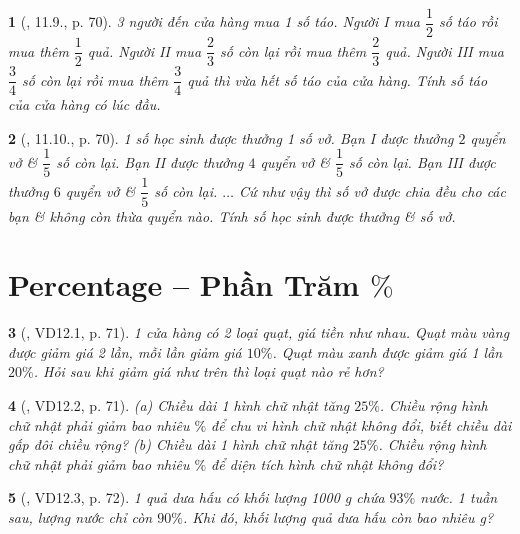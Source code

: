 \documentclass{article}
\newtheorem{baitoan}{}
\begin{document}
\begin{baitoan}[\cite{TLCT_THCS_Toan_6_so_hoc}, 11.9., p. 70]
	3 người đến cửa hàng mua 1 số táo. Người I mua $\dfrac{1}{2}$ số táo rồi mua thêm $\dfrac{1}{2}$ quả. Người II mua $\dfrac{2}{3}$ số còn lại rồi mua thêm $\dfrac{2}{3}$ quả. Người III mua $\dfrac{3}{4}$ số còn lại rồi mua thêm $\dfrac{3}{4}$ quả thì vừa hết số táo của cửa hàng. Tính số táo của cửa hàng có lúc đầu.
\end{baitoan}

\begin{baitoan}[\cite{TLCT_THCS_Toan_6_so_hoc}, 11.10., p. 70]
	1 số học sinh được thưởng 1 số vở. Bạn I được thưởng $2$ quyển vở \& $\dfrac{1}{5}$ số còn lại. Bạn II được thưởng $4$ quyển vở \& $\dfrac{1}{5}$ số còn lại. Bạn III được thưởng $6$ quyển vở \& $\dfrac{1}{5}$ số còn lại. $\ldots$ Cứ như vậy thì số vở được chia đều cho các bạn \& không còn thừa quyển nào. Tính số học sinh được thưởng \& số vở.
\end{baitoan}


\section{Percentage -- Phần Trăm $\%$}

\begin{baitoan}[\cite{TLCT_THCS_Toan_6_so_hoc}, VD12.1, p. 71]
	1 cửa hàng có 2 loại quạt, giá tiền như nhau. Quạt màu vàng được giảm giá 2 lần, mỗi lần giảm giá $10\%$. Quạt màu xanh được giảm giá 1 lần $20\%$. Hỏi sau khi giảm giá như trên thì loại quạt nào rẻ hơn?
\end{baitoan}

\begin{baitoan}[\cite{TLCT_THCS_Toan_6_so_hoc}, VD12.2, p. 71]
	(a) Chiều dài 1 hình chữ nhật tăng $25\%$. Chiều rộng hình chữ nhật phải giảm bao nhiêu $\%$ để chu vi hình chữ nhật không đổi, biết chiều dài gấp đôi chiều rộng? (b) Chiều dài 1 hình chữ nhật tăng $25\%$. Chiều rộng hình chữ nhật phải giảm bao nhiêu $\%$ để diện tích hình chữ nhật không đổi?
\end{baitoan}

\begin{baitoan}[\cite{TLCT_THCS_Toan_6_so_hoc}, VD12.3, p. 72]
	1 quả dưa hấu có khối lượng {\rm1000 g} chứa $93\%$ nước. 1 tuần sau, lượng nước chỉ còn $90\%$. Khi đó, khối lượng quả dưa hấu còn bao nhiêu {\rm g}?
\end{baitoan}
\end{document}
